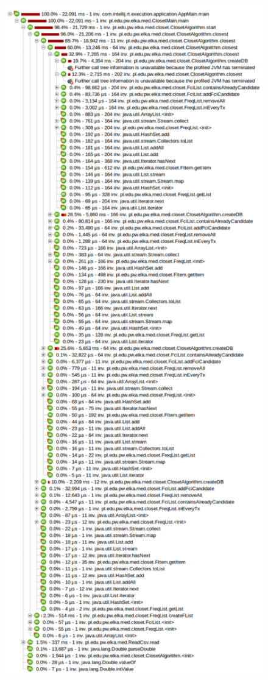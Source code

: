 \begin{figure}
\includegraphics[width=14cm]{res/closet-profi.png}
\label{closet:profil}
\end{figure}